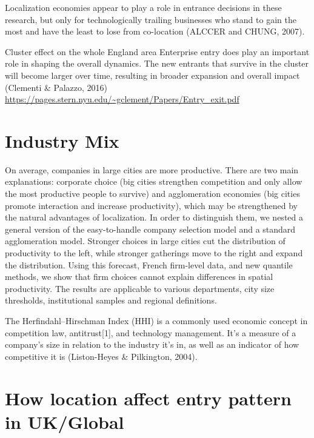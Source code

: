 \documentclass[
  12pt,
  oneside]{book}
\begin{document}
Localization economies appear to play a role in entrance decisions in these research, but only for technologically trailing businesses who stand to gain the most and have the least to lose from co-location (ALCCER and CHUNG, 2007).

Cluster effect on the whole England area
Enterprise entry does play an important role in shaping the overall dynamics. The new entrants that survive in the cluster will become larger over time, resulting in broader expansion and overall impact (Clementi \& Palazzo, 2016)
\url{https://pages.stern.nyu.edu/~gclement/Papers/Entry_exit.pdf}

\hypertarget{industry-mix}{%
\section{Industry Mix}\label{industry-mix}}

On average, companies in large cities are more productive. There are two main explanations: corporate choice (big cities strengthen competition and only allow the most productive people to survive) and agglomeration economies (big cities promote interaction and increase productivity), which may be strengthened by the natural advantages of localization. In order to distinguish them, we nested a general version of the easy-to-handle company selection model and a standard agglomeration model. Stronger choices in large cities cut the distribution of productivity to the left, while stronger gatherings move to the right and expand the distribution. Using this forecast, French firm-level data, and new quantile methods, we show that firm choices cannot explain differences in spatial productivity. The results are applicable to various departments, city size thresholds, institutional samples and regional definitions.

The Herfindahl--Hirschman Index (HHI) is a commonly used economic concept in competition law, antitrust{[}1{]}, and technology management. It's a measure of a company's size in relation to the industry it's in, as well as an indicator of how competitive it is \hspace{0pt}(Liston-Heyes \& Pilkington, 2004).

\hypertarget{how-location-affect-entry-pattern-in-ukglobal}{%
\section{How location affect entry pattern in UK/Global}\label{how-location-affect-entry-pattern-in-ukglobal}}
\end{document}
